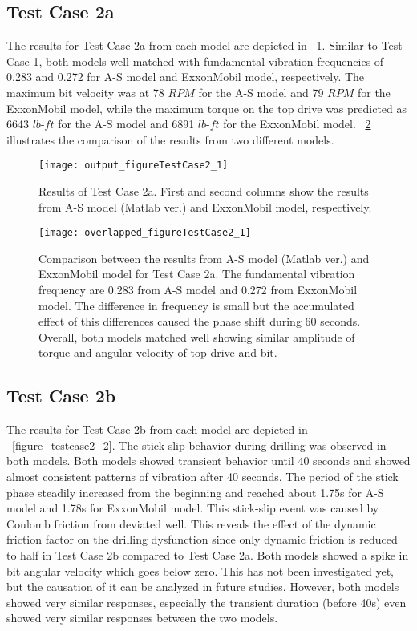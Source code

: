 \subsection{Test Case 2a}
The results for Test Case 2a from each model are depicted in \figurename~\ref{figure_testcase2_1}. Similar to Test Case 1, both models well matched with fundamental vibration frequencies of 0.283 and 0.272 for A-S model and ExxonMobil model, respectively. The maximum bit velocity was at 78 $RPM$ for the A-S model and 79 $RPM$ for the ExxonMobil model, while the maximum torque on the top drive was predicted as 6643 $lb\mbox{-}ft$ for the A-S model and 6891 $lb\mbox{-}ft$ for the ExxonMobil model. \figurename~\ref{figure_testcase2_1_overlapped} illustrates the comparison of the results from two different models. 
\begin{figure}
  \centering
  \texttt{[image: output\_figureTestCase2\_1]}
  \caption[Results of Test Case 2a]{Results of Test Case 2a. First and second columns show the results from A-S model (Matlab ver.) and ExxonMobil model, respectively.}\label{figure_testcase2_1}
\end{figure}

\begin{figure}
  \centering
  \texttt{[image: overlapped\_figureTestCase2\_1]}
  \caption[Comparison of the results for Test Case 2a]{Comparison between the results from A-S model (Matlab ver.) and ExxonMobil model for Test Case 2a. The fundamental vibration frequency are 0.283 from A-S model and 0.272 from ExxonMobil model. The difference in frequency is small but the accumulated effect of this differences caused the phase shift during 60 seconds. Overall, both models matched well showing similar amplitude of torque and angular velocity of top drive and bit.}\label{figure_testcase2_1_overlapped}
\end{figure}


\subsection{Test Case 2b}
The results for Test Case 2b from each model are depicted in \figurename~\ref{figure_testcase2_2}. The stick-slip behavior during drilling was observed in both models. Both models showed transient behavior until 40 seconds and showed almost consistent patterns of vibration after 40 seconds. The period of the stick phase steadily increased from the beginning and reached about 1.75s for A-S model and 1.78s for ExxonMobil model. This stick-slip event was caused by Coulomb friction from deviated well. This reveals the effect of the dynamic friction factor on the drilling dysfunction since only dynamic friction is reduced to half in Test Case 2b compared to Test Case 2a. Both models showed a spike in bit angular velocity which goes below zero. This has not been investigated yet, but the causation of it can be analyzed in future studies. However, both models showed very similar responses, especially the transient duration (before 40s) even showed very similar responses between the two models.

